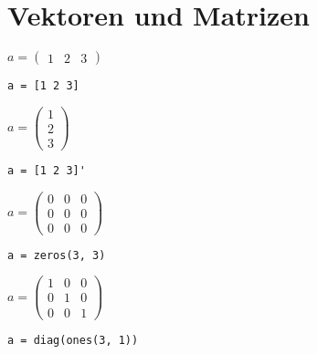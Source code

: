 \documentclass
[
  draft    = true,
  fontsize = 11pt,
  parskip  = half-,
  BCOR     = 0pt,
  DIV      = calc,
  dvipsnames
]
{scrartcl}
\newcommand{\mathwidth}{0.29}
\newcommand{\codewidth}{0.70}
\begin{document}

\section{Vektoren und Matrizen}
\begin{minipage}{\mathwidth\textwidth}
  $\displaystyle
  a=\begin{pmatrix}
      1 & 2 & 3
    \end{pmatrix}
  $
\end{minipage}%
\hfill
\begin{minipage}{\codewidth\textwidth}
\begin{verbatim}
a = [1 2 3]
\end{verbatim}
\end{minipage}\bigskip

\begin{minipage}{\mathwidth\textwidth}
  $\displaystyle
  a=\begin{pmatrix}
      1 \\
      2 \\
      3
    \end{pmatrix}
  $
\end{minipage}%
\hfill
\begin{minipage}{\codewidth\textwidth}
\begin{verbatim}
a = [1 2 3]'
\end{verbatim}
\end{minipage}\bigskip

\begin{minipage}{\mathwidth\textwidth}
  $\displaystyle
  a=\begin{pmatrix}
      0 & 0 & 0 \\
      0 & 0 & 0 \\
      0 & 0 & 0
    \end{pmatrix}
  $
\end{minipage}%
\hfill
\begin{minipage}{\codewidth\textwidth}
\begin{verbatim}
a = zeros(3, 3)
\end{verbatim}
\end{minipage}\bigskip

\begin{minipage}{\mathwidth\textwidth}
  $\displaystyle
  a=\begin{pmatrix}
      1 & 0 & 0 \\
      0 & 1 & 0 \\
      0 & 0 & 1
    \end{pmatrix}
  $
\end{minipage}%
\hfill
\begin{minipage}{\codewidth\textwidth}
\begin{verbatim}
a = diag(ones(3, 1))
\end{verbatim}
\end{minipage}\bigskip
\end{document}
